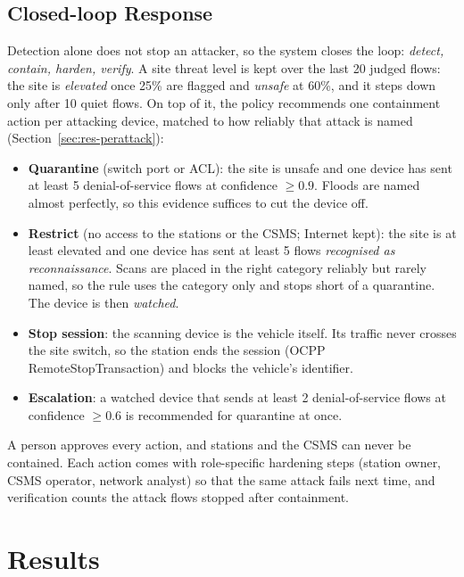 \documentclass[conference]{IEEEtran}
\begin{document}
\subsection{Closed-loop Response}
\label{sec:response}

Detection alone does not stop an attacker, so the system closes the loop: \emph{detect, contain, harden, verify}. A site threat level is kept over the last 20 judged flows: the site is \emph{elevated} once 25\% are flagged and \emph{unsafe} at 60\%, and it steps down only after 10 quiet flows. On top of it, the policy recommends one containment action per attacking device, matched to how reliably that attack is named (Section~\ref{sec:res-perattack}):
\begin{itemize}
    \item \textbf{Quarantine} (switch port or ACL): the site is unsafe and one device has sent at least 5 denial-of-service flows at confidence $\ge 0.9$. Floods are named almost perfectly, so this evidence suffices to cut the device off.
    \item \textbf{Restrict} (no access to the stations or the CSMS; Internet kept): the site is at least elevated and one device has sent at least 5 flows \emph{recognised as reconnaissance}. Scans are placed in the right category reliably but rarely named, so the rule uses the category only and stops short of a quarantine. The device is then \emph{watched}.
    \item \textbf{Stop session}: the scanning device is the vehicle itself. Its traffic never crosses the site switch, so the station ends the session (OCPP RemoteStopTransaction) and blocks the vehicle's identifier.
    \item \textbf{Escalation}: a watched device that sends at least 2 denial-of-service flows at confidence $\ge 0.6$ is recommended for quarantine at once.
\end{itemize}
A person approves every action, and stations and the CSMS can never be contained. Each action comes with role-specific hardening steps (station owner, CSMS operator, network analyst) so that the same attack fails next time, and verification counts the attack flows stopped after containment.

\section{Results}
\label{sec:results}
\end{document}
